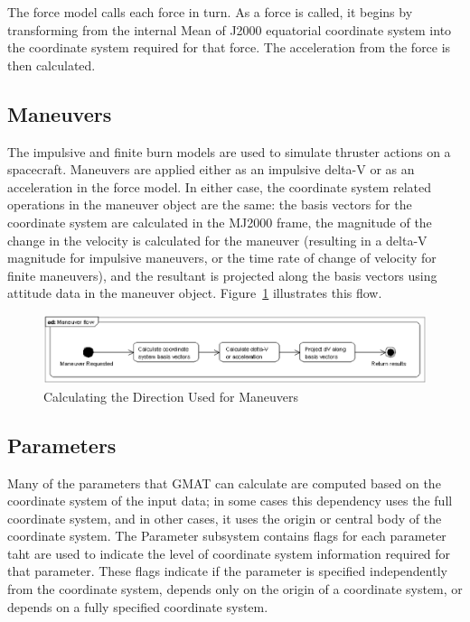 The force model calls each force in turn. As a force is called, it begins by transforming from the
internal Mean of J2000 equatorial coordinate system into the coordinate system required for that
force.  The acceleration from the force is then calculated.

\subsection{Maneuvers}

The impulsive and finite burn models are used to simulate thruster actions on a spacecraft.
Maneuvers are applied either as an impulsive delta-V or as an acceleration in the force model. In
either case, the coordinate system related operations in the maneuver object are the same: the basis
vectors for the coordinate system are calculated in the MJ2000 frame, the magnitude of the change in
the velocity is calculated for the maneuver (resulting in a delta-V magnitude for impulsive
maneuvers, or the time rate of change of velocity for finite maneuvers), and the resultant is
projected along the basis vectors using attitude data in the maneuver object.
Figure~\ref{figure:ManeuverFlow} illustrates this flow.

\begin{figure}
\begin{center}
\includegraphics[scale=0.5]{Images/Maneuverflow.eps}
\caption{\label{figure:ManeuverFlow}Calculating the Direction Used for Maneuvers}
\end{center}
\end{figure}

\subsection{Parameters}

Many of the parameters that GMAT can calculate are computed based on the coordinate system of the
input data; in some cases this dependency uses the full coordinate system, and in other cases, it
uses the origin or central body of the coordinate system. The Parameter subsystem contains flags for
each parameter taht are used to indicate the level of coordinate system information required for
that parameter. These flags indicate if the parameter is specified independently from the coordinate
system, depends only on the origin of a coordinate system, or depends on a fully specified
coordinate system.

